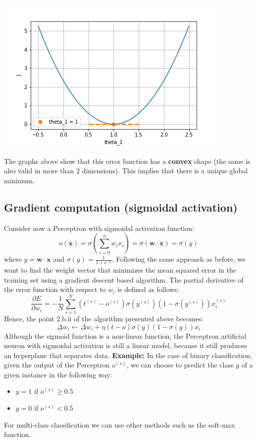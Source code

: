 \begin{center}
    \includegraphics[scale=0.5]{images/partial derivative_2.png}
\end{center}
The graphs above show that this error function has a \textbf{convex} shape (the same is also valid in more than 2 dimensions). This implies that there is a unique global minimum. 
\subsection{Gradient computation (sigmoidal activation)}
Consider now a Perceptron with sigmoidal activation function:
\[o(\textbf{x}) = \sigma \left( \sum_{i=0}^{n}w_{i}x_{i}\right) = \sigma(\textbf{w} \cdot \textbf{x}) = \sigma(y)\]
where $y = \textbf{w} \cdot \textbf{x}$ and $\sigma(y) = \frac{1}{1 + e^{-y}}$. Following the same approach as before, we want to find the weight vector that minimizes the mean squared error in the training set using a gradient descent based algorithm.\newline\newline
The partial derivative of the error function with respect to $w_{i}$ is defined as follows:
\[\frac{\partial E}{\partial w_{i}} = -\frac{1}{N}\sum_{s=1}^{N}(t^{(s)} - o^{(s)})\sigma(y^{(s)})(1 - \sigma(y^{(s)}))x_{i}^{(s)}\]
Hence, the point 2.b.ii of the algorithm presented above becomes:
\[\Delta w_{i} \leftarrow \Delta w_{i} + \eta (t - o)\sigma(y)(1 - \sigma(y))x_{i}\]
Although the sigmoid function is a non-linear function, the Perceptron artificial neuron with sigmoidal activation is still a linear model, because it still produces an hyperplane that separates data.\newline\newline
\textbf{Example:}\newline
In the case of binary classification, given the output of the Perceptron $o^{(s)}$, we can choose to predict the class $y$ of a given instance in the following way:
\begin{itemize}
    \item $y = 1$ if $o^{(s)} \geq 0.5$
    \item $y = 0$ if $o^{(s)} < 0.5$ 
\end{itemize}
For multi-class classification we can use other methods such as the soft-max function.
